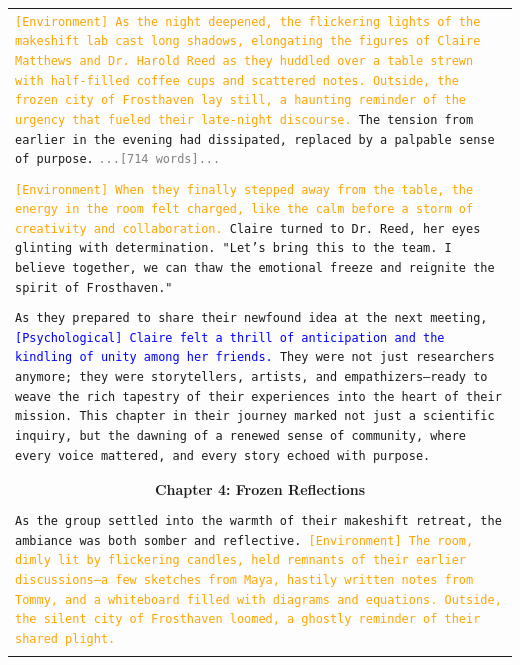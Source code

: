 \documentclass[letterpaper]{article} %
\begin{document}
\begin{small}
\begin{longtable}{p{\textwidth}}
    \texttt{\textcolor{orange}{[Environment] As the night deepened, the flickering lights of the makeshift lab cast long shadows, elongating the figures of Claire Matthews and Dr. Harold Reed as they huddled over a table strewn with half-filled coffee cups and scattered notes. Outside, the frozen city of Frosthaven lay still, a haunting reminder of the urgency that fueled their late-night discourse.} The tension from earlier in the evening had dissipated, replaced by a palpable sense of purpose.}
    \texttt{\textcolor{gray}{...[714 words]...}} \\\\

    \texttt{\textcolor{orange}{[Environment] When they finally stepped away from the table, the energy in the room felt charged, like the calm before a storm of creativity and collaboration.} Claire turned to Dr. Reed, her eyes glinting with determination. "Let's bring this to the team. I believe together, we can thaw the emotional freeze and reignite the spirit of Frosthaven."} \\\\

    \texttt{As they prepared to share their newfound idea at the next meeting, \textcolor{blue}{[Psychological] Claire felt a thrill of anticipation and the kindling of unity among her friends.} They were not just researchers anymore; they were storytellers, artists, and empathizers—ready to weave the rich tapestry of their experiences into the heart of their mission. This chapter in their journey marked not just a scientific inquiry, but the dawning of a renewed sense of community, where every voice mattered, and every story echoed with purpose.} \\\\

    \midrule \\
    \multicolumn{1}{c}{\normalsize \textbf{Chapter 4: Frozen Reflections}} \\\\
    
    \texttt{As the group settled into the warmth of their makeshift retreat, the ambiance was both somber and reflective. \textcolor{orange}{[Environment] The room, dimly lit by flickering candles, held remnants of their earlier discussions—a few sketches from Maya, hastily written notes from Tommy, and a whiteboard filled with diagrams and equations. Outside, the silent city of Frosthaven loomed, a ghostly reminder of their shared plight.}} \\\\


\end{longtable}
\end{small}
\end{document}
